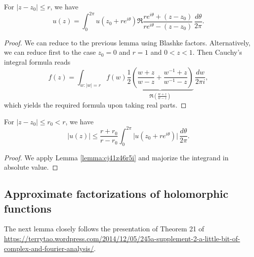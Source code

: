 \documentclass[reqno]{amsart} 
\begin{document}
\begin{lemma}\label{lemma:cj41z46r5i}
  For $\lvert z - z_0 \rvert \leq r$, we have
  \begin{equation*}
    u(z) = \int_0^{2 \pi } u (z_0 + r e^{i \theta }) \Re \frac{r e^{i \theta } + (z - z_0 )}{r e^{i \theta } - (z - z_0 )}
    \, \frac{d \theta }{2 \pi }.
  \end{equation*}
\end{lemma}
\begin{proof}
  We can reduce to the previous lemma using Blashke factors.  Alternatively, we can reduce first to the case $z_0 = 0$ and $r = 1$ and $0 < z < 1$.  Then Cauchy's integral formula reads
  \begin{equation*}
    f(z) =
    \int_{w : \lvert w \rvert = r}
    f(w)
    \underbrace
{
\frac{1}{2} \left(
      \frac{w + z}{w - z}
      + 
      \frac{w^{-1}  + z}{w^{-1}  - z}
    \right)
}_{
\Re \left( \frac{w + z}{w - z} \right)
}
\, \frac{d w}{2 \pi i},
  \end{equation*}
  which yields the required formula upon taking real parts.
\end{proof}

\begin{lemma}\label{lemma:cj41z46zau}
  For $\lvert z - z_0 \rvert \leq r_0 < r$, we have
  \begin{equation*}
    \lvert u(z) \rvert \leq \frac{r + r_0}{r - r_0}
\int_{0 }^{2 \pi } \lvert u (z_0 + r e^{i \theta }) \rvert \, \frac{d \theta }{2 \pi}.    
  \end{equation*}
\end{lemma}
\begin{proof}
We apply Lemma \ref{lemma:cj41z46r5i} and majorize the integrand in absolute value.
\end{proof}

\subsection{Approximate factorizations of holomorphic functions}\label{sec:cj41z5fwla}
The next lemma closely follows the presentation of Theorem 21 of \href{these notes}{https://terrytao.wordpress.com/2014/12/05/245a-supplement-2-a-little-bit-of-complex-and-fourier-analysis/}.
\end{document}
